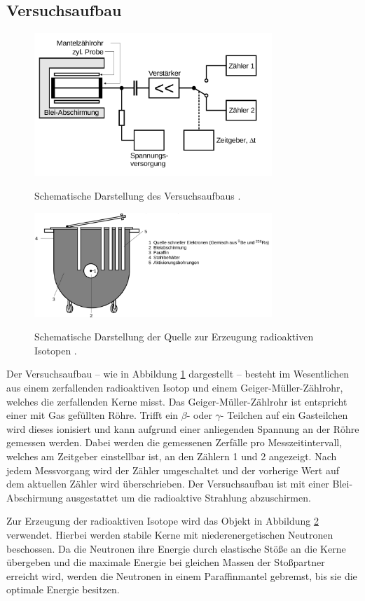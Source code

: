 \subsection{Versuchsaufbau}
\label{sec:Versuchsaufbau}
\begin{figure}
	\centering
	\caption{Schematische Darstellung des Versuchsaufbaus \cite{Anleitung}.}
	\includegraphics[width=0.8\textwidth]{Bilder/aufbau.png}
	\label{fig:aufbau}
\end{figure}

\begin{figure}
	\centering
	\caption{Schematische Darstellung der Quelle zur Erzeugung radioaktiven Isotopen \cite{Anleitung}.}
	\includegraphics[width=0.8\textwidth]{Bilder/toepfchen.png}%
	\label{fig:kochen}
\end{figure}

Der Versuchsaufbau -- wie in Abbildung \ref{fig:aufbau} dargestellt -- besteht im Wesentlichen
aus einem zerfallenden radioaktiven Isotop und einem Geiger-Müller-Zählrohr, welches die
zerfallenden Kerne misst.
Das Geiger-Müller-Zählrohr ist entspricht einer mit Gas gefüllten Röhre. Trifft ein $\beta$-
oder $\gamma$- Teilchen auf ein Gasteilchen wird dieses ionisiert und kann aufgrund einer
anliegenden Spannung an der Röhre gemessen werden.
Dabei werden die gemessenen Zerfälle pro Messzeitintervall, welches am Zeitgeber einstellbar
ist, an den Zählern 1 und 2 angezeigt. Nach jedem Messvorgang wird der Zähler umgeschaltet und
der vorherige Wert auf dem aktuellen Zähler wird überschrieben. Der Versuchsaufbau ist mit
einer Blei-Abschirmung ausgestattet um die radioaktive Strahlung abzuschirmen.

Zur Erzeugung der radioaktiven Isotope wird das Objekt in Abbildung \ref{fig:kochen} verwendet.
Hierbei werden stabile Kerne mit niederenergetischen Neutronen beschossen.
Da die Neutronen ihre Energie durch elastische Stöße an die Kerne übergeben und die maximale
Energie bei gleichen Massen der Stoßpartner erreicht wird, werden die Neutronen in einem
Paraffinmantel gebremst, bis sie die optimale Energie besitzen.
